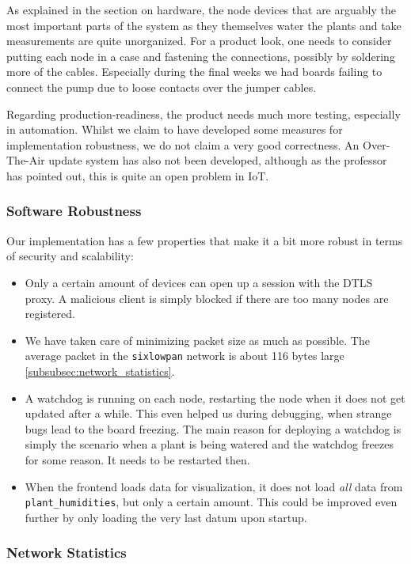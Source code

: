 \documentclass[acmtog, language=english, nonacm]{acmart}
\begin{document}
    As explained in the section on hardware, the node devices that are arguably the most important parts of the system as they themselves water the plants and take measurements are quite unorganized. For a product look, one needs to consider putting each node in a case and fastening the connections, possibly by soldering more of the cables. Especially during the final weeks we had boards failing to connect the pump due to loose contacts over the jumper cables.

    Regarding production-readiness, the product needs much more testing, especially in automation. Whilst we claim to have developed some measures for implementation robustness, we do not claim a very good correctness. An Over-The-Air update system has also not been developed, although as the professor has pointed out, this is quite an open problem in IoT.

    \subsubsection{Software Robustness}

    Our implementation has a few properties that make it a bit more robust in terms of security and scalability:
    \begin{itemize}
        \item Only a certain amount of devices can open up a session with the DTLS proxy. A malicious client is simply blocked if there are too many nodes are registered.
        \item We have taken care of minimizing packet size as much as possible. The average packet in the \texttt{sixlowpan} network is about 116 bytes large \cref{subsubsec:network_statistics}.
        \item A watchdog is running on each node, restarting the node when it does not get updated after a while. This even helped us during debugging, when strange bugs lead to the board freezing. The main reason for deploying a watchdog is simply the scenario when a plant is being watered and the watchdog freezes for some reason. It needs to be restarted then.
        \item When the frontend loads data for visualization, it does not load \emph{all} data from \texttt{plant\_humidities}, but only a certain amount. This could be improved even further by only loading the very last datum upon startup.
    \end{itemize}

    \label{subsubsec:network_statistics} \subsubsection{Network Statistics}
\end{document}
